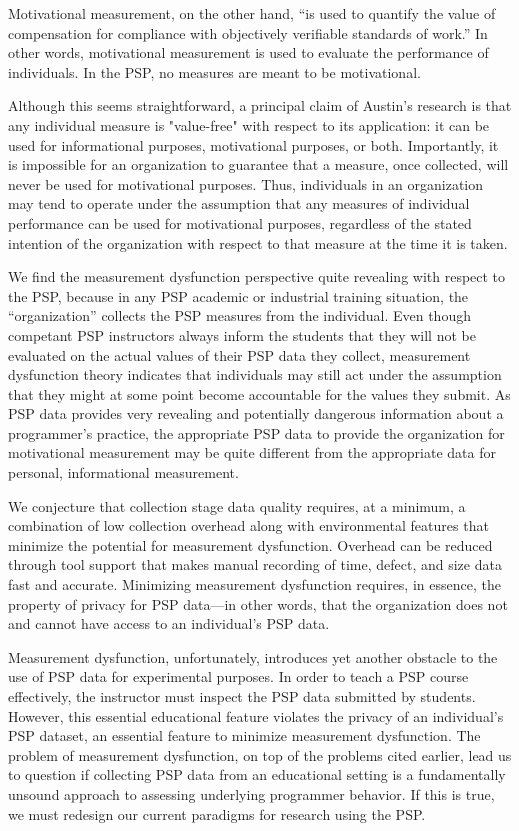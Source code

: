 Motivational measurement, on the other hand, ``is used to quantify the
value of compensation for compliance with objectively verifiable standards
of work.'' In other words, motivational measurement is used to evaluate the
performance of individuals. In the PSP, no measures are meant to be
motivational.

Although this seems straightforward, a principal claim of Austin's research
is that any individual measure is "value-free" with respect to its
application: it can be used for informational purposes, motivational
purposes, or both.  Importantly, it is impossible for an organization to
guarantee that a measure, once collected, will never be used for
motivational purposes.  Thus, individuals in an organization may tend to
operate under the assumption that any measures of individual performance
can be used for motivational purposes, regardless of the stated intention
of the organization with respect to that measure at the time it is taken.

We find the measurement dysfunction perspective quite revealing with
respect to the PSP, because in any PSP academic or industrial training
situation, the ``organization'' collects the PSP measures from the
individual.  Even though competant PSP instructors always inform the
students that they will not be evaluated on the actual values of their PSP
data they collect, measurement dysfunction theory indicates that
individuals may still act under the assumption that they might at some
point become accountable for the values they submit.  As PSP data provides
very revealing and potentially dangerous information about a programmer's
practice, the appropriate PSP data to provide the organization for
motivational measurement may be quite different from the appropriate data
for personal, informational measurement.

We conjecture that collection stage data quality requires, at a minimum, a
combination of low collection overhead along with environmental features
that minimize the potential for measurement dysfunction. Overhead can be
reduced through tool support that makes manual recording of time, defect,
and size data fast and accurate.  Minimizing measurement dysfunction
requires, in essence, the property of privacy for PSP data---in other
words, that the organization does not and cannot have access to an
individual's PSP data.

Measurement dysfunction, unfortunately, introduces yet another obstacle to
the use of PSP data for experimental purposes.  In order to teach a PSP
course effectively, the instructor must inspect the PSP data submitted by
students.  However, this essential educational feature violates the privacy
of an individual's PSP dataset, an essential feature to minimize
measurement dysfunction.  The problem of measurement dysfunction, on top of
the problems cited earlier, lead us to question if collecting PSP data from
an educational setting is a fundamentally unsound approach to assessing
underlying programmer behavior. If this is true, we must redesign our
current paradigms for research using the PSP.







